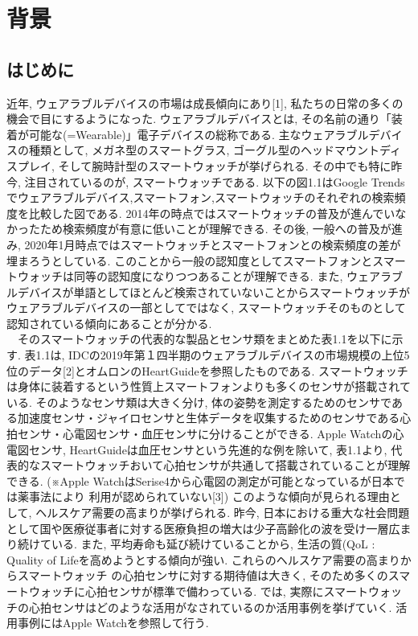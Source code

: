 \documentclass[report, 11pt, a4paper]{jsbook}
\begin{document}
{\large \tableofcontents}
\clearpage

\chapter{背景}
\section{はじめに}
近年, ウェアラブルデバイスの市場は成長傾向にあり[1], 私たちの日常の多くの機会で目にするようになった. ウェアラブルデバイスとは,  その名前の通り「装着が可能な(=Wearable)」電子デバイスの総称である. 主なウェアラブルデバイスの種類として, メガネ型のスマートグラス, ゴーグル型のヘッドマウントディスプレイ, そして腕時計型のスマートウォッチが挙げられる. その中でも特に昨今, 注目されているのが, スマートウォッチである. 以下の図1.1はGoogle Trendsでウェアラブルデバイス,スマートフォン,スマートウォッチのそれぞれの検索頻度を比較した図である. 2014年の時点ではスマートウォッチの普及が進んでいなかったため検索頻度が有意に低いことが理解できる. その後, 一般への普及が進み, 2020年1月時点ではスマートウォッチとスマートフォンとの検索頻度の差が埋まろうとしている. このことから一般の認知度としてスマートフォンとスマートウォッチは同等の認知度になりつつあることが理解できる. また, ウェアラブルデバイスが単語としてほとんど検索されていないことからスマートウォッチがウェアラブルデバイスの一部としてではなく, スマートウォッチそのものとして認知されている傾向にあることが分かる.\\
　そのスマートウォッチの代表的な製品とセンサ類をまとめた表1.1を以下に示す. 表1.1は, IDCの2019年第１四半期のウェアラブルデバイスの市場規模の上位5位のデータ[2]とオムロンのHeartGuideを参照したものである. スマートウォッチは身体に装着するという性質上スマートフォンよりも多くのセンサが搭載されている. そのようなセンサ類は大きく分け, 体の姿勢を測定するためのセンサである加速度センサ・ジャイロセンサと生体データを収集するためのセンサである心拍センサ・心電図センサ・血圧センサに分けることができる. Apple Watchの心電図センサ, HeartGuideは血圧センサという先進的な例を除いて, 表1.1より, 代表的なスマートウォッチおいて心拍センサが共通して搭載されていることが理解できる. (※Apple WatchはSerise4から心電図の測定が可能となっているが日本では薬事法により
利用が認められていない[3]) このような傾向が見られる理由として, ヘルスケア需要の高まりが挙げられる. 昨今, 日本における重大な社会問題として国や医療従事者に対する医療負担の増大は少子高齢化の波を受け一層広まり続けている. また, 平均寿命も延び続けていることから, 生活の質(QoL : Quality of Lifeを高めようとする傾向が強い. これらのヘルスケア需要の高まりからスマートウォッチ の心拍センサに対する期待値は大きく, そのため多くのスマートウォッチに心拍センサが標準で備わっている. では, 実際にスマートウォッチの心拍センサはどのような活用がなされているのか活用事例を挙げていく. 活用事例にはApple Watchを参照して行う.\\
\end{document}
